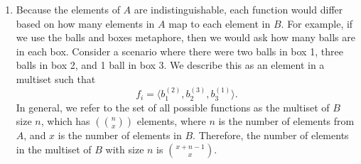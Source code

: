 \documentclass{article}
\begin{document}
\begin{enumerate}
\item Because the elements of $A$ are indistinguishable, each function would differ based on how many elements in $A$ map to each element in $B$. For example, if we use the balls and boxes metaphore, then we would ask how many balls are in each box. Consider a scenario where there were two balls in box 1, three balls in box 2, and 1 ball in box 3. We describe this as an element in a multiset such that 
\begin{equation*}
	f_i = \langle b_1^{(2)}, b_2^{(3)}, b_3^{(1)}\rangle.
\end{equation*}
In general, we refer to the set of all possible functions as the multiset of $B$ size $n$, which has  $\left ( {n \choose x} \right )$ elements, where $n$ is the number of elements from $A$, and $x$ is the number of elements in $B$. Therefore, the number of elements in the multiset of $B$ with size $n$ is ${x + n - 1 \choose x}$. 


\end{enumerate}
\end{document}
